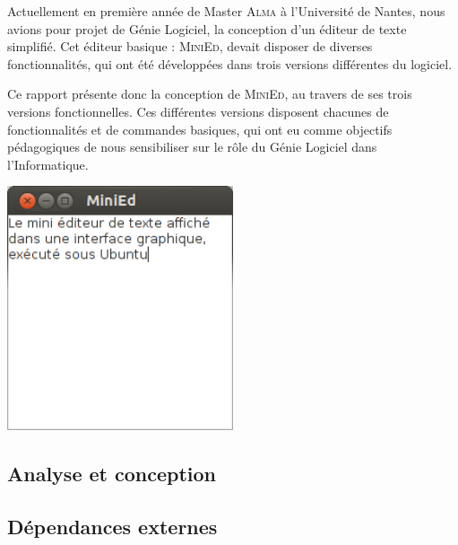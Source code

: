 \documentclass[a4paper]{article}
\begin{document}
	\vspace{0.5cm}

	Actuellement en première année de Master \textsc{Alma} à l’Université de Nantes, nous avions pour projet de Génie Logiciel, la conception d’un éditeur de texte simplifié. Cet éditeur basique : \textsc{MiniEd}, devait disposer de diverses fonctionnalités, qui ont été développées dans trois versions différentes du logiciel.  

	\vspace{0.5cm}

	Ce rapport présente donc la conception de \textsc{MiniEd}, au travers de ses trois versions fonctionnelles. Ces différentes versions disposent chacunes de fonctionnalités et de commandes basiques, qui ont eu comme objectifs pédagogiques de nous sensibiliser sur le rôle du Génie Logiciel dans l'Informatique.

	\vspace{2.5cm}

	\begin{center}
		\includegraphics[width=0.5\textwidth]{MiniEd_capture.png}~
	\end{center}

	\newpage


	\begin{center}
		\section{Analyse et conception}
	\end{center}

	\vspace{0.5cm}

		\subsection{Dépendances externes}
\end{document}
